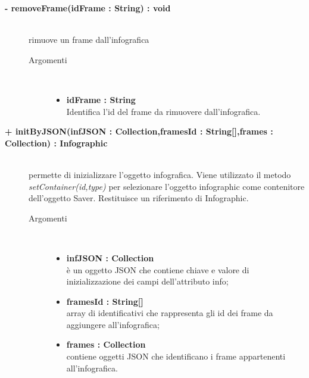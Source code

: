 \begin{description}
		\begin{description}
		\item[\textbf{\color{blue}- removeFrame(idFrame : String) : void			}] \hfill \\
			rimuove un frame dall'infografica
			
		\begin{description}
			\item[Argomenti] \hfill \\
				\begin{itemize}
				
					\item \textbf{idFrame : String			} \hfill \\
						Identifica l'id del frame da rimuovere dall'infografica.
				\end{itemize}
		\end{description}

\end{description}

\begin{description}
		\item[\textbf{\color{blue}+ initByJSON(infJSON : Collection,framesId : String[],frames : Collection) : Infographic			}] \hfill \\
			permette di inizializzare l'oggetto infografica. Viene utilizzato il metodo \textit{setContainer(id,type)} per selezionare l'oggetto infographic come contenitore dell'oggetto Saver. Restituisce un riferimento di Infographic.
			
		\begin{description}
			\item[Argomenti] \hfill \\
				\begin{itemize}
				
					\item \textbf{infJSON : Collection			} \hfill \\
					è un oggetto JSON che contiene chiave e valore di inizializzazione dei campi dell'attributo info;
					\item \textbf{framesId : String[]			} \hfill \\
					array di identificativi che rappresenta gli id dei frame da aggiungere all'infografica;
					\item \textbf{frames : Collection			} \hfill \\
					contiene oggetti JSON che identificano i frame appartenenti all'infografica. 
				\end{itemize}
		\end{description}


\end{description}
\end{description}
